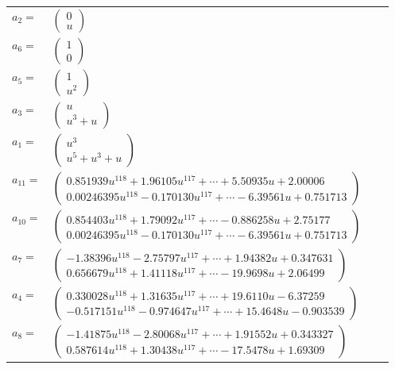\documentclass[1p]{elsarticle_modified}
\theoremstyle{definition}
\begin{document}
\begin{tabular}{m{7pt} m{180pt} m{7pt} m{180pt} }
\flushright $a_{2}=$&$\begin{pmatrix}0\\u\end{pmatrix}$ \\
\flushright $a_{6}=$&$\begin{pmatrix}1\\0\end{pmatrix}$ \\
\flushright $a_{5}=$&$\begin{pmatrix}1\\u^2\end{pmatrix}$ \\
\flushright $a_{3}=$&$\begin{pmatrix}u\\u^3+u\end{pmatrix}$ \\
\flushright $a_{1}=$&$\begin{pmatrix}u^3\\u^5+u^3+u\end{pmatrix}$ \\
\flushright $a_{11}=$&$\begin{pmatrix}0.851939 u^{118}+1.96105 u^{117}+\cdots+5.50935 u+2.00006\\0.00246395 u^{118}-0.170130 u^{117}+\cdots-6.39561 u+0.751713\end{pmatrix}$ \\
\flushright $a_{10}=$&$\begin{pmatrix}0.854403 u^{118}+1.79092 u^{117}+\cdots-0.886258 u+2.75177\\0.00246395 u^{118}-0.170130 u^{117}+\cdots-6.39561 u+0.751713\end{pmatrix}$ \\
\flushright $a_{7}=$&$\begin{pmatrix}-1.38396 u^{118}-2.75797 u^{117}+\cdots+1.94382 u+0.347631\\0.656679 u^{118}+1.41118 u^{117}+\cdots-19.9698 u+2.06499\end{pmatrix}$ \\
\flushright $a_{4}=$&$\begin{pmatrix}0.330028 u^{118}+1.31635 u^{117}+\cdots+19.6110 u-6.37259\\-0.517151 u^{118}-0.974647 u^{117}+\cdots+15.4648 u-0.903539\end{pmatrix}$ \\
\flushright $a_{8}=$&$\begin{pmatrix}-1.41875 u^{118}-2.80068 u^{117}+\cdots+1.91552 u+0.343327\\0.587614 u^{118}+1.30438 u^{117}+\cdots-17.5478 u+1.69309\end{pmatrix}$ \\

\end{tabular}
\end{document}
